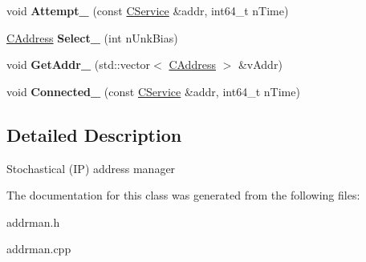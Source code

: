 \begin{DoxyCompactItemize}
\item 
\mbox{\label{class_c_addr_man_ab1a1bfa8b435ef139570c88de1a5245f}} 
void {\bfseries Attempt\+\_\+} (const \mbox{\hyperlink{class_c_service}{C\+Service}} \&addr, int64\+\_\+t n\+Time)
\item 
\mbox{\label{class_c_addr_man_acd799cecb73e466d1369e6e2f23d3a8d}} 
\mbox{\hyperlink{class_c_address}{C\+Address}} {\bfseries Select\+\_\+} (int n\+Unk\+Bias)
\item 
\mbox{\label{class_c_addr_man_aff86d04dc7c0e0afae3ff5998417db17}} 
void {\bfseries Get\+Addr\+\_\+} (std\+::vector$<$ \mbox{\hyperlink{class_c_address}{C\+Address}} $>$ \&v\+Addr)
\item 
\mbox{\label{class_c_addr_man_a1ae72643c51293f3f3345e74ce0368ca}} 
void {\bfseries Connected\+\_\+} (const \mbox{\hyperlink{class_c_service}{C\+Service}} \&addr, int64\+\_\+t n\+Time)
\end{DoxyCompactItemize}


\subsection{Detailed Description}
Stochastical (IP) address manager 

The documentation for this class was generated from the following files\+:\begin{DoxyCompactItemize}
\item 
addrman.\+h\item 
addrman.\+cpp\end{DoxyCompactItemize}
